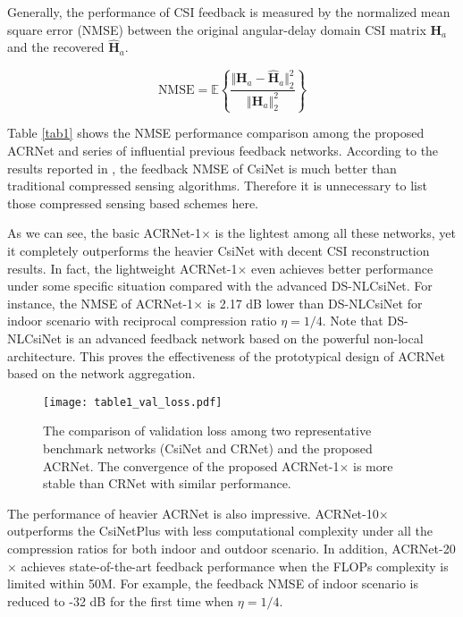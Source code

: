 \documentclass[12pt, draftclsnofoot, onecolumn]{IEEEtran}
\begin{document}
Generally, the performance of CSI feedback is measured by the normalized mean square error (NMSE) between the original angular-delay domain CSI matrix $\mathbf{H}_a$ and the recovered $\hat{\mathbf{H}}_a$.

\begin{equation} \label{eq8}
	\text{NMSE} = \mathbb{E}\left\{\frac{\Vert \mathbf{H}_a - \hat{\mathbf{H}}_a \Vert_2^2} {\left\Vert \mathbf{H}_a\right\Vert_2^2} \right\}
\end{equation}

Table \ref{tab1} shows the NMSE performance comparison among the proposed ACRNet and series of influential previous feedback networks. According to the results reported in \cite{wen2018deep}, the feedback NMSE of CsiNet is much better than traditional compressed sensing algorithms. Therefore it is unnecessary to list those compressed sensing based schemes here.

As we can see, the basic ACRNet-1$\times$ is the lightest among all these networks, yet it completely outperforms the heavier CsiNet with decent CSI reconstruction results. In fact, the lightweight ACRNet-1$\times$ even achieves better performance under some specific situation compared with the advanced DS-NLCsiNet. For instance, the NMSE of ACRNet-1$\times$ is 2.17 dB lower than DS-NLCsiNet for indoor scenario with reciprocal compression ratio $\eta=1/4$. Note that DS-NLCsiNet is an advanced feedback network based on the powerful non-local architecture. This proves the effectiveness of the prototypical design of ACRNet based on the network aggregation.

\begin{figure}[!b]
\centering
\texttt{[image: table1\_val\_loss.pdf]}
\caption{The comparison of validation loss among two representative benchmark networks (CsiNet and CRNet) and the proposed ACRNet. The convergence of the proposed ACRNet-1$\times$ is more stable than CRNet with similar performance.}
\label{Table1 Loss}
\end{figure}

The performance of heavier ACRNet is also impressive. ACRNet-10$\times$ outperforms the CsiNetPlus with less computational complexity under all the compression ratios for both indoor and outdoor scenario. In addition, ACRNet-20$\times$ achieves state-of-the-art feedback performance when the FLOPs complexity is limited within 50M. For example, the feedback NMSE of indoor scenario is reduced to -32 dB for the first time when $\eta=1/4$.
\end{document}
